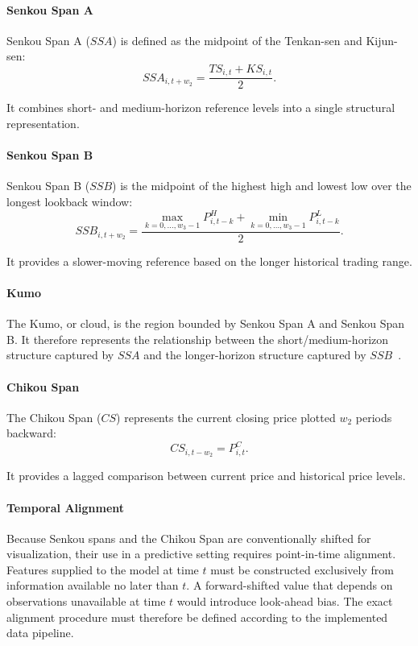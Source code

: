 \paragraph{Senkou Span A}
Senkou Span A ($SSA$) is defined as the midpoint of the Tenkan-sen and Kijun-sen:
\begin{equation}
	SSA_{i,t+w_2}=\frac{TS_{i,t}+KS_{i,t}}{2}.
\end{equation}

It combines short- and medium-horizon reference levels into a single structural representation.

\paragraph{Senkou Span B}
Senkou Span B ($SSB$) is the midpoint of the highest high and lowest low over the longest lookback window:
\begin{equation}
	SSB_{i,t+w_2}=\frac{\max_{k=0,\ldots,w_3-1}P_{i,t-k}^{H}+\min_{k=0,\ldots,w_3-1}P_{i,t-k}^{L}}{2}.
\end{equation}

It provides a slower-moving reference based on the longer historical trading range.

\paragraph{Kumo}
The Kumo, or cloud, is the region bounded by Senkou Span A and Senkou Span B. It therefore represents the relationship between the short/medium-horizon structure captured by $SSA$ and the longer-horizon structure captured by $SSB$~\cite{Cahyadi2012,Deng2021}.

\paragraph{Chikou Span}
The Chikou Span ($CS$) represents the current closing price plotted $w_2$ periods backward:
\begin{equation}
	CS_{i,t-w_2}=P_{i,t}^{C}.
\end{equation}

It provides a lagged comparison between current price and historical price levels.

\paragraph{Temporal Alignment}
Because Senkou spans and the Chikou Span are conventionally shifted for visualization, their use in a predictive setting requires point-in-time alignment. Features supplied to the model at time $t$ must be constructed exclusively from information available no later than $t$. A forward-shifted value that depends on observations unavailable at time $t$ would introduce look-ahead bias. The exact alignment procedure must therefore be defined according to the implemented data pipeline.

